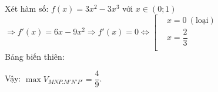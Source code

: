 \begin{ex}
{		Xét hàm số: $ f(x)=3x^2-3x^3$ với $ x\in\left(0;1\right)$\\
		$\Rightarrow f'(x)=6x-9x^2\Rightarrow f'(x)=0\Leftrightarrow\left[\begin{aligned}
			& x=0~(\text{loại})\\ 
			& x=\dfrac{2}{3}\\ 
		\end{aligned}\right.$\\
		Bảng biến thiên:
		\begin{center}
		\end{center}
		Vậy: $\max{{V}_{MNP.M'N'P'}}=\dfrac{4}{9}$.
	}
\end{ex}

